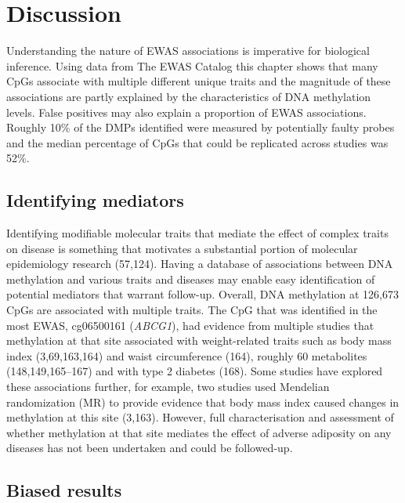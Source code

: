 \documentclass[11pt,oneside]{bristolthesis}
\begin{document}
\hypertarget{discussion-04}{%
\section{Discussion}\label{discussion-04}}

Understanding the nature of EWAS associations is imperative for biological inference. Using data from The EWAS Catalog this chapter shows that many CpGs associate with multiple different unique traits and the magnitude of these associations are partly explained by the characteristics of DNA methylation levels. False positives may also explain a proportion of EWAS associations. Roughly 10\% of the DMPs identified were measured by potentially faulty probes and the median percentage of CpGs that could be replicated across studies was 52\%.

\hypertarget{identifying-mediators}{%
\subsection{Identifying mediators}\label{identifying-mediators}}

Identifying modifiable molecular traits that mediate the effect of complex traits on disease is something that motivates a substantial portion of molecular epidemiology research (57,124). Having a database of associations between DNA methylation and various traits and diseases may enable easy identification of potential mediators that warrant follow-up. Overall, DNA methylation at 126,673 CpGs are associated with multiple traits. The CpG that was identified in the most EWAS, cg06500161 (\emph{ABCG1}), had evidence from multiple studies that methylation at that site associated with weight-related traits such as body mass index (3,69,163,164) and waist circumference (164), roughly 60 metabolites (148,149,165--167) and with type 2 diabetes (168). Some studies have explored these associations further, for example, two studies used Mendelian randomization (MR) to provide evidence that body mass index caused changes in methylation at this site (3,163). However, full characterisation and assessment of whether methylation at that site mediates the effect of adverse adiposity on any diseases has not been undertaken and could be followed-up.

\hypertarget{biased-results}{%
\subsection{Biased results}\label{biased-results}}
\end{document}
